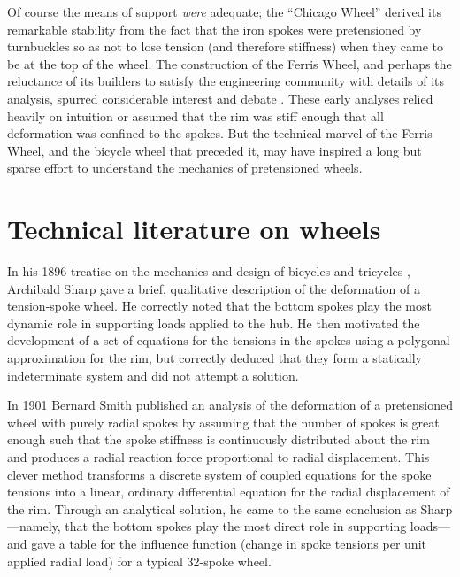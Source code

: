 \documentclass[../thesis.tex]{subfiles}
\begin{document}
Of course the means of support \emph{were} adequate; the ``Chicago Wheel'' derived its remarkable stability from the fact that the iron spokes were pretensioned by turnbuckles so as not to lose tension (and therefore stiffness) when they came to be at the top of the wheel. The construction of the Ferris Wheel, and perhaps the reluctance of its builders to satisfy the engineering community with details of its analysis, spurred considerable interest and debate \cite{FerrisWheelDiscussion,Searles1893}. These early analyses relied heavily on intuition or assumed that the rim was stiff enough that all deformation was confined to the spokes. But the technical marvel of the Ferris Wheel, and the bicycle wheel that preceded it, may have inspired a long but sparse effort to understand the mechanics of pretensioned wheels.


\section{Technical literature on wheels}

In his 1896 treatise on the mechanics and design of bicycles and tricycles \cite{Sharp1977}, Archibald Sharp gave a brief, qualitative description of the deformation of a tension-spoke wheel. He correctly noted that the bottom spokes play the most dynamic role in supporting loads applied to the hub. He then motivated the development of a set of equations for the tensions in the spokes using a polygonal approximation for the rim, but correctly deduced that they form a statically indeterminate system and did not attempt a solution.

In 1901 Bernard Smith \cite{Smith1901} published an analysis of the deformation of a pretensioned wheel with purely radial spokes by assuming that the number of spokes is great enough such that the spoke stiffness is continuously distributed about the rim and produces a radial reaction force proportional to radial displacement. This clever method transforms a discrete system of coupled equations for the spoke tensions into a linear, ordinary differential equation for the radial displacement of the rim. Through an analytical solution, he came to the same conclusion as Sharp---namely, that the bottom spokes play the most direct role in supporting loads---and gave a table for the influence function (change in spoke tensions per unit applied radial load) for a typical 32-spoke wheel.
\end{document}
